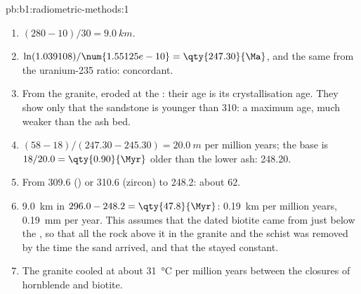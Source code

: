 \begin{solution}{pb:b1:radiometric-methods:1}
\begin{enumerate}
        of question~17: the uncertainty comes from the , not
        from the ages.
  \item $(280 - 10)/30 = \qty{9.0}{km}$.
  \item $\ln(1.039108)/\num{1.55125e-10} = \qty{247.30}{\Ma}$, and the same from
        the uranium-235 ratio: concordant.
  \item From the granite, eroded at the : their age is its
        crystallisation age. They show only that the sandstone is younger than
        \qty{310}{\Ma}: a maximum age, much weaker than the ash bed.
  \item $(58 - 18)/(247.30 - 245.30) = \qty{20.0}{m}$ per million years; the base
        is $18/20.0 = \qty{0.90}{\Myr}$ older than the lower ash:
        \qty{248.20}{\Ma}.
  \item From \qty{309.6}{\Ma} () or \qty{310.6}{\Ma} (zircon) to
        \qty{248.2}{\Ma}: about \qty{62}{\Myr}.
  \item \qty{9.0}{km} in $296.0 - 248.2 = \qty{47.8}{\Myr}$: \qty{0.19}{km} per
        million years, \qty{0.19}{mm} per year. This assumes that the dated
        biotite came from just below the , so that all the rock above
        it in the granite and the schist was removed by the time the sand arrived,
        and that the  stayed constant.
  \item The granite cooled at about \qty{31}{\celsius} per million years
        between the closures of hornblende and biotite.
\end{enumerate}
\end{solution}
